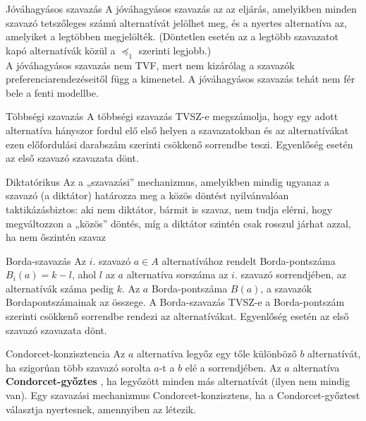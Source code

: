 	\begin{definition}{Jóváhagyásos szavazás}{}
		A jóváhagyásos szavazás az az eljárás, amelyikben minden szavazó tetszőleges	számú alternatívát jelölhet meg, és a nyertes alternatíva az, amelyiket a legtöbben megjelölték.
		(Döntetlen esetén az a legtöbb szavazatot kapó alternatívák közül a $\preceq_1$ szerinti legjobb.) \\
		A jóváhagyásos szavazás nem TVF, mert nem kizárólag a szavazók preferenciarendezéseitől
		függ a kimenetel. A jóváhagyásos szavazás tehát nem fér bele a fenti modellbe.
	\end{definition}
	
	\begin{definition}{Többségi szavazás}{}
		A többségi szavazás TVSZ-e megszámolja, hogy egy adott alternatíva hányszor fordul elő első helyen a szavazatokban és az alternatívákat ezen előfordulási darabszám szerinti csökkenő sorrendbe teszi. Egyenlőség esetén az első szavazó szavazata dönt.
	\end{definition}
	
	\begin{definition}{Diktatórikus}{}
		Az a „szavazási” mechanizmus, amelyikben mindig ugyanaz a szavazó (a diktátor) határozza meg a közös döntést nyilvánvalóan taktikázásbiztos: aki nem diktátor, bármit is szavaz, nem tudja elérni, hogy megváltozzon a „közös” döntés, míg a diktátor szintén csak rosszul járhat azzal, ha nem őszintén szavaz
	\end{definition}
	
	\begin{definition}{Borda-szavazás}{}
		Az $i.$ szavazó $a \in A$ alternatívához rendelt Borda-pontszáma $B_i(a) = k - l$, ahol $l$ az $a$ alternatíva sorszáma az $i.$ szavazó sorrendjében, az alternatívák száma pedig $k$. Az $a$ Borda-pontszáma $B(a)$, a szavazók Bordapontszámainak az összege. A Borda-szavazás TVSZ-e a Borda-pontszám szerinti csökkenő sorrendbe rendezi az alternatívákat. Egyenlőség esetén az első szavazó szavazata dönt.
	\end{definition}
	
	\begin{definition}{Condorcet-konzisztencia}{}
		Az $a$ alternatíva legyőz egy tőle különböző $b$ alternatívát, ha szigorúan több szavazó sorolta $a$-t a $b$ elé a sorrendjében. Az $a$ alternatíva \textbf{Condorcet-győztes} , ha legyőzött minden más alternatívát (ilyen nem mindig van). Egy szavazási mechanizmus Condorcet-konzisztens, ha a Condorcet-győztest választja nyertesnek, amennyiben az létezik.
	\end{definition}
	
